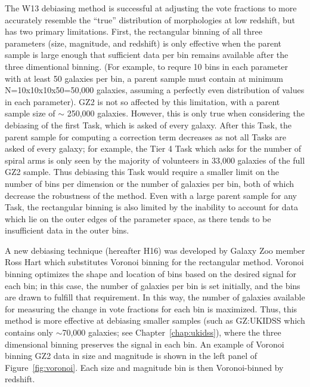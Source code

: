 The W13 debiasing method is successful at adjusting the vote fractions to more accurately resemble the ``true'' distribution of morphologies at low redshift, but has two primary limitations. First, the rectangular binning of all three parameters (size, magnitude, and redshift) is only effective when the parent sample is large enough that sufficient data per bin remains available after the three dimentional binning. (For example, to requre 10 bins in each parameter with at least 50 galaxies per bin, a parent sample must contain at minimum N=10x10x10x50=50,000 galaxies, assuming a perfectly even distribution of values in each parameter). GZ2 is not so affected by this limitation, with a parent sample size of $\sim$ 250,000 galaxies. However, this is only true when considering the debiasing of the first Task, which is asked of every galaxy. After this Task, the parent sample for computing a correction term decreases as not all Tasks are asked of every galaxy; for example, the Tier 4 Task which asks for the number of spiral arms is only seen by the majority of volunteers in 33,000 galaxies of the full GZ2 sample. Thus debiasing this Task would require a smaller limit on the number of bins per dimension or the number of galaxies per bin, both of which decrease the robustness of the method. Even with a large parent sample for any Task, the rectangular binning is also limited by the inability to account for data which lie on the outer edges of the parameter space, as there tends to be insufficient data in the outer bins. 

A new debiasing technique (hereafter H16) was developed by Galaxy Zoo member Ross Hart \citep{Hart2016} which substitutes Voronoi binning for the rectangular method. Voronoi binning optimizes the shape and location of bins based on the desired signal for each bin; in this case, the number of galaxies per bin is set initially, and the bins are drawn to fulfill that requirement. In this way, the number of galaxies available for measuring the change in vote fractions for each bin is maximized. Thus, this method is more effective at debiasing smaller samples (such as GZ:UKIDSS which contains only $\sim$70,000 galaxies; see Chapter~\ref{chap:ukidss}), where the three dimensional binning preserves the signal in each bin. An example of Voronoi binning GZ2 data in size and magnitude is shown in the left panel of Figure~\ref{fig:voronoi}. Each size and magnitude bin is then Voronoi-binned by redshift. 

